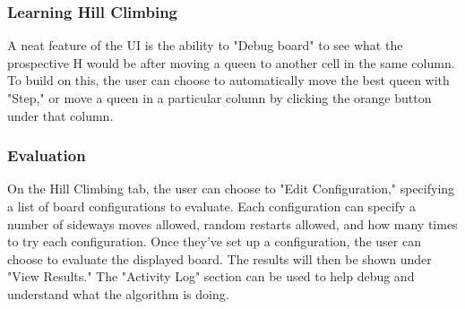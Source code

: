 \subsubsection{Learning Hill Climbing}
A neat feature of the UI is the ability to "Debug board" to see what the prospective H would be after moving a queen to
another cell in the same column. To build on this, the user can choose to automatically move the best queen with "Step,"
or move a queen in a particular column by clicking the orange button under that column.

\subsubsection{Evaluation}
On the Hill Climbing tab, the user can choose to "Edit Configuration," specifying a list of board configurations to
evaluate. Each configuration can specify a number of sideways moves allowed, random restarts allowed, and how many
times to try each configuration. Once they've set up a configuration, the user can choose to evaluate the displayed
board. The results will then be shown under "View Results." The "Activity Log" section can be used to help debug and
understand what the algorithm is doing.
